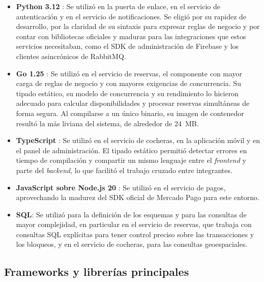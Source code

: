 \begin{itemize}
    \item \textbf{Python 3.12} \autocite{python}: Se utilizó en la puerta de enlace, en el servicio de autenticación y en el servicio de notificaciones. Se eligió por su rapidez de desarrollo, por la claridad de su sintaxis para expresar reglas de negocio y por contar con bibliotecas oficiales y maduras para las integraciones que estos servicios necesitaban, como el SDK de administración de Firebase y los clientes asincrónicos de RabbitMQ.
    \item \textbf{Go 1.25} \autocite{golang}: Se utilizó en el servicio de reservas, el componente con mayor carga de reglas de negocio y con mayores exigencias de concurrencia. Su tipado estático, su modelo de concurrencia y su rendimiento lo hicieron adecuado para calcular disponibilidades y procesar reservas simultáneas de forma segura. Al compilarse a un único binario, su imagen de contenedor resultó la más liviana del sistema, de alrededor de 24~MB.
    \item \textbf{TypeScript} \autocite{typescript}: Se utilizó en el servicio de cocheras, en la aplicación móvil y en el panel de administración. El tipado estático permitió detectar errores en tiempo de compilación y compartir un mismo lenguaje entre el \textit{frontend} y parte del \textit{backend}, lo que facilitó el trabajo cruzado entre integrantes.
    \item \textbf{JavaScript sobre Node.js 20} \autocite{nodejs}: Se utilizó en el servicio de pagos, aprovechando la madurez del SDK oficial de Mercado Pago para este entorno.
    \item \textbf{SQL}: Se utilizó para la definición de los esquemas y para las consultas de mayor complejidad, en particular en el servicio de reservas, que trabaja con consultas SQL explícitas para tener control preciso sobre las transacciones y los bloqueos, y en el servicio de cocheras, para las consultas geoespaciales.
\end{itemize}

\subsection{Frameworks y librerías principales}

